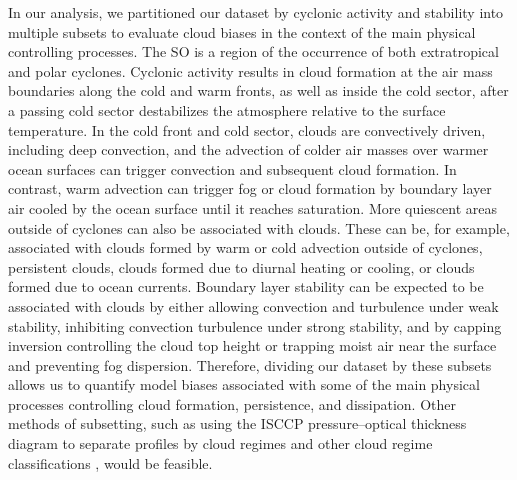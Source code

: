\documentclass[draft]{agujournal2019}
\begin{document}
In our analysis, we partitioned our dataset by cyclonic activity and stability into multiple subsets to evaluate cloud biases in the context of the main physical controlling processes. The SO is a region of the occurrence of both extratropical and polar cyclones. Cyclonic activity results in cloud formation at the air mass boundaries along the cold and warm fronts, as well as inside the cold sector, after a passing cold sector destabilizes the atmosphere relative to the surface temperature. In the cold front and cold sector, clouds are convectively driven, including deep convection, and the advection of colder air masses over warmer ocean surfaces can trigger convection and subsequent cloud formation. In contrast, warm advection can trigger fog or cloud formation by boundary layer air cooled by the ocean surface until it reaches saturation. More quiescent areas outside of cyclones can also be associated with clouds. These can be, for example, associated with clouds formed by warm or cold advection outside of cyclones, persistent clouds, clouds formed due to diurnal heating or cooling, or clouds formed due to ocean currents. Boundary layer stability can be expected to be associated with clouds by either allowing convection and turbulence under weak stability, inhibiting convection turbulence under strong stability, and by capping inversion controlling the cloud top height or trapping moist air near the surface and preventing fog dispersion. Therefore, dividing our dataset by these subsets allows us to quantify model biases associated with some of the main physical processes controlling cloud formation, persistence, and dissipation. Other methods of subsetting, such as using the ISCCP pressure--optical thickness diagram \cite{rossow1991,rossow1999,hahn2001} to separate profiles by cloud regimes and other cloud regime classifications \cite{oreopoulos2016,schuddeboom2018}, would be feasible.
\end{document}
